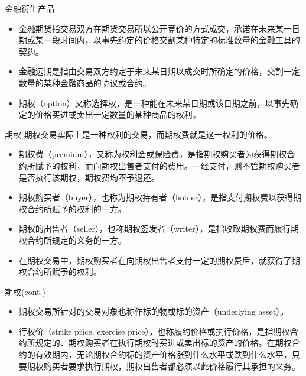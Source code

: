 \documentclass[t]{beamer}
\begin{document}
\begin{frame}{金融衍生产品}
	\begin{itemize}
		\item 金融期货指交易双方在期货交易所以公开竞价的方式成交，承诺在未来某一日期或某一段时间内，以事先约定的价格交割某种特定的{\color{red}标准数量的金融工具}的契约。
		\item 金融远期是指由交易双方约定于未来某日期以成交时所确定的价格，交割一定数量的某种金融商品的协议或合约。
		\item 期权（option）又称选择权，是一种能在未来某日期或该日期之前，以事先确定的价格买进或卖出一定数量的某种商品的{\color{red}权利}。
	\end{itemize}
\end{frame}



\begin{frame}{期权}
	期权交易实际上是一种权利的交易，而期权费就是这一权利的价格。
	\begin{itemize}
		\item 
	期权费（premium），又称为权利金或保险费，是指期权购买者为获得期权合约所赋予的权利，而向期权出售者支付的费用。一经支付，则不管期权购买者是否执行该期权，期权费均不予退还。
	\item 
	期权购买者（buyer），也称为期权持有者（holder），是指支付期权费以获得期权合约所赋予的权利的一方。
	\item 
	期权的出售者（seller），也称期权签发者（writer），是指收取期权费而履行期权合约所规定的义务的一方。
	\item 在期权交易中，期权购买者在向期权出售者支付一定的期权费后，就获得了期权合约所赋予的权利。
\end{itemize}

\end{frame}



\begin{frame}{期权(cont.)}
	\begin{itemize}
		\item 
	期权交易所针对的交易对象也称作标的物或标的资产（underlying asset）。
	\item 行权价（strike price, exercise price），也称履约价格或执行价格，是指期权合约所规定的、期权购买者在执行期权时买进或卖出标的资产的价格。在期权合约的有效期内，无论期权合约标的资产价格涨到什么水平或跌到什么水平，只要期权购买者要求执行期权，期权出售者都必须以此价格履行其承担的义务。
\end{itemize}

\end{frame}
\end{document}
